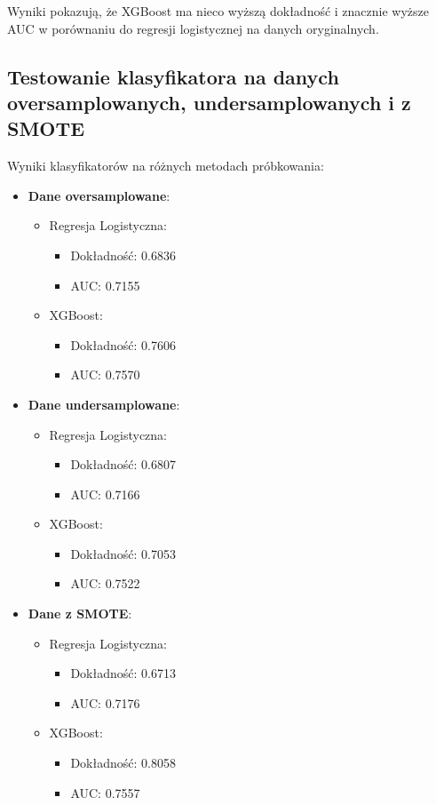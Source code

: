 \documentclass{article}
\begin{document}
Wyniki pokazują, że XGBoost ma nieco wyższą dokładność i znacznie wyższe AUC w porównaniu do regresji logistycznej na danych oryginalnych.

\subsection{Testowanie klasyfikatora na danych oversamplowanych, undersamplowanych i z SMOTE}

Wyniki klasyfikatorów na różnych metodach próbkowania:

\begin{itemize}
    \item \textbf{Dane oversamplowane}:
    \begin{itemize}
        \item Regresja Logistyczna:
        \begin{itemize}
            \item Dokładność: 0.6836
            \item AUC: 0.7155
        \end{itemize}
        \item XGBoost:
        \begin{itemize}
            \item Dokładność: 0.7606
            \item AUC: 0.7570
        \end{itemize}
    \end{itemize}
    \item \textbf{Dane undersamplowane}:
    \begin{itemize}
        \item Regresja Logistyczna:
        \begin{itemize}
            \item Dokładność: 0.6807
            \item AUC: 0.7166
        \end{itemize}
        \item XGBoost:
        \begin{itemize}
            \item Dokładność: 0.7053
            \item AUC: 0.7522
        \end{itemize}
    \end{itemize}
    \item \textbf{Dane z SMOTE}:
    \begin{itemize}
        \item Regresja Logistyczna:
        \begin{itemize}
            \item Dokładność: 0.6713
            \item AUC: 0.7176
        \end{itemize}
        \item XGBoost:
        \begin{itemize}
            \item Dokładność: 0.8058
            \item AUC: 0.7557
        \end{itemize}
    \end{itemize}
\end{itemize}
\end{document}
